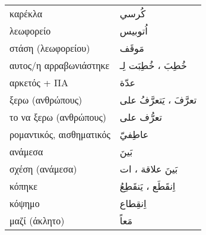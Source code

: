 \documentclass[twocolumn,a4paper]{article}
\newcommand{\ar}[1]{\textarabic{#1}}
\newcommand{\pl}{\raisebox{0.15ex}{\footnotesize ◍}}
\newcommand{\normpl}[1]{\ar{ #1، ات }}
\newcommand{\vrf}{\raisebox{0.15ex}{\footnotesize ◉}}
\newcommand{\mas}{\raisebox{0.15ex}{\footnotesize ◫}}
\begin{document}
\begin{mpsupertabular}{ P{0.5\textwidth} P{0.5\textwidth} }
καρέκλα                      & \ar{ كُرسي } \\
λεωφορείο                    & \ar{ اُتوبيس } \\
στάση (λεωφορείου)           & \ar{ مَوقَف } \\

αυτος/η αρραβωνιάστηκε       & \ar{ خُطِبَ ، خُطِبَت لِـ } \\
αρκετός + ΠΑ                 & \ar{ عدّة } \\
ξερω (ανθρώπους) \vrf        & \ar{ تعرَّفَ ، يَتعرَّفُ على } \\
το να ξερω (ανθρώπους) \mas  & \ar{ تعرُّف على } \\
ρομαντικός, αισθηματικός     & \ar{ عاطِفيّ } \\
ανάμεσα                      & \ar{ بَينَ } \\
σχέση (ανάμεσα)  \pl         & \ar{ بَينَ }\normpl{ علاقة } \\
κόπηκε \vrf                  & \ar{ اِنقَطَع ، يَنقَطِعُ } \\
κόψημο \mas                  & \ar{ اِنقِطاع } \\
μαζί (άκλητο)                & \ar{ مَعاً } \\


\end{mpsupertabular}
\end{document}
